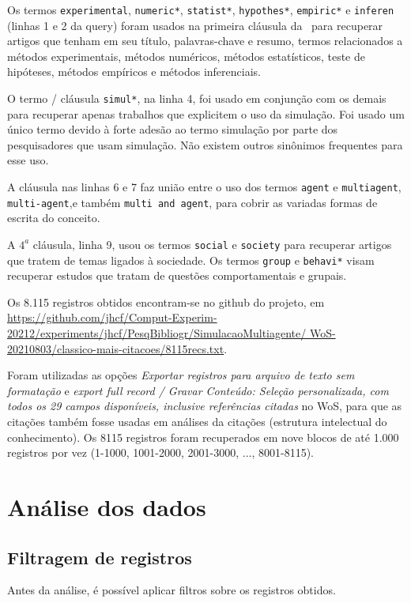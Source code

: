Os termos \texttt{experimental}, \texttt{numeric*}, \texttt{statist*}, \texttt{hypothes*}, 
\texttt{empiric*}
e \texttt{inferen} (linhas 1 e 2 da query) foram usados na primeira cláusula da \query\  para recuperar artigos que tenham em seu título, palavras-chave e resumo, termos relacionados a métodos experimentais,
métodos numéricos,
métodos estatísticos,
teste de hipóteses,
métodos empíricos e métodos inferenciais.

O termo / cláusula  \texttt{simul*}, na linha 4, foi usado em conjunção com os demais para recuperar apenas trabalhos que explicitem o uso da simulação.
Foi usado um único termo devido à forte adesão ao termo simulação por parte dos pesquisadores que usam simulação. Não existem outros sinônimos frequentes para esse uso.

A cláusula nas linhas 6 e 7 faz união entre o uso dos termos \texttt{agent} e \texttt{multiagent}, \texttt{multi-agent},e  também \texttt{multi and agent}, para cobrir as variadas formas de escrita do conceito.

A $4^{a}$ cláusula, linha 9,  usou os termos \texttt{social} e \texttt{society} para recuperar artigos que tratem de temas ligados à sociedade.
Os termos \texttt{group} e \texttt{behavi*} visam recuperar estudos que tratam de questões comportamentais e grupais.

Os 8.115 registros obtidos encontram-se no github do projeto, em \url{https://github.com/jhcf/Comput-Experim-20212/experiments/jhcf/PesqBibliogr/SimulacaoMultiagente/ WoS-20210803/classico-mais-citacoes/8115recs.txt}. 

Foram utilizadas as opções \textit{Exportar registros para arquivo de texto sem formatação} e \textit{export full record / Gravar Conteúdo: Seleção personalizada, com todos os 29 campos disponíveis, inclusive referências citadas} no WoS, para que as citações também fosse usadas em análises da citações (estrutura intelectual do conhecimento). Os 8115 registros foram recuperados em nove blocos de até 1.000 registros por vez (1-1000, 1001-2000, 2001-3000, ..., 8001-8115).

\section{Análise dos dados}

\subsection{Filtragem de registros}
Antes da análise, é possível aplicar filtros sobre os registros obtidos.

